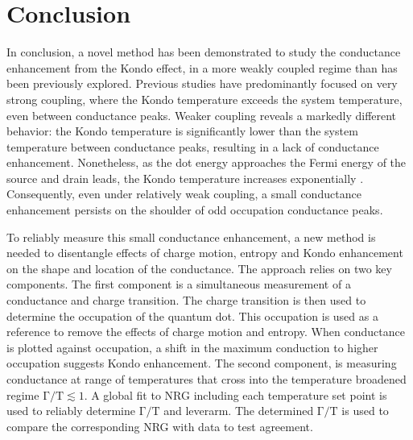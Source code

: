 \chapter{Conclusion}\label{cha:conclusion}


In conclusion, a novel method has been demonstrated to study the conductance enhancement from the Kondo effect, in a more weakly coupled regime than has been previously explored. 
Previous studies have predominantly focused on very strong coupling, where the Kondo temperature exceeds the system temperature, even between conductance peaks.
Weaker coupling reveals a markedly different behavior: the Kondo temperature is significantly lower than the system temperature between conductance peaks, resulting in a lack of conductance enhancement.
Nonetheless, as the dot energy approaches the Fermi energy of the source and drain leads, the Kondo temperature increases exponentially . 
Consequently, even under relatively weak coupling, a small conductance enhancement persists on the shoulder of odd occupation conductance peaks.




To reliably measure this small conductance enhancement, a new method is needed to disentangle effects of charge motion, entropy and Kondo enhancement on the shape and location of the conductance. 
The approach relies on two key components. 
The first component is a simultaneous measurement of a conductance and charge transition. The charge transition is then used to determine the occupation of the quantum dot. This occupation is used as a reference to remove the effects of charge motion and entropy. When conductance is plotted against occupation, a shift in the maximum conduction to higher occupation suggests Kondo enhancement. 
The second component, is measuring conductance at range of temperatures that cross into the temperature broadened regime $\mathrm{\Gamma/T} \lesssim 1$. A global fit to NRG including each temperature set point is used to reliably determine $\mathrm{\Gamma/T}$ and leverarm. The determined $\mathrm{\Gamma/T}$ is used to compare the corresponding NRG with data to test agreement. 

